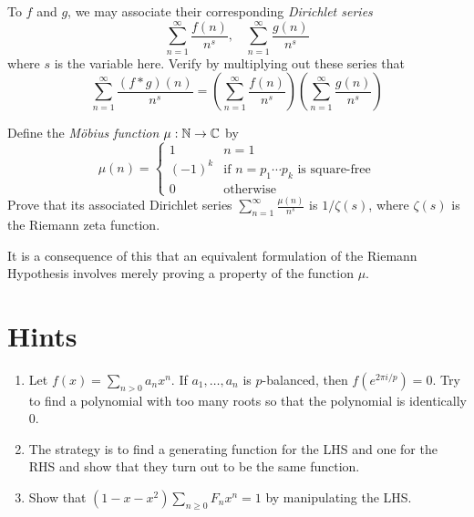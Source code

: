\documentclass{article}
\begin{document}
To $f$ and $g$, we may associate their corresponding \emph{Dirichlet series} 
\[\sum_{n=1}^\infty \frac{f(n)}{n^s},\ \ \ \ \sum_{n=1}^\infty \frac{g(n)}{n^s}\] where $s$ is the variable here. Verify by multiplying out these series that 
\[\sum_{n=1}^\infty \frac{(f*g)(n)}{n^s} = \left(\sum_{n=1}^\infty \frac{f(n)}{n^s}\right)\left(\sum_{n=1}^\infty \frac{g(n)}{n^s}\right)\]
\begin{exercise}
Define the \emph{Möbius function} $\mu:\mathbb{N}\to \mathbb{C}$ by 
\[\mu(n)=\begin{cases} 1 & n=1 \\ (-1)^k & \text{if $n=p_1\cdots p_k$ is square-free} \\ 0 & \text{otherwise}\end{cases}\]
Prove that its associated Dirichlet series $\sum_{n=1}^\infty \frac{\mu(n)}{n^s}$ is $1/\zeta(s)$, where $\zeta(s)$ is the Riemann zeta function. 
\end{exercise}
It is a consequence of this that an equivalent formulation of the Riemann Hypothesis involves merely proving a property of the function $\mu$.


\newpage

\section{Hints}

\begin{enumerate}
    \item Let \(f(x)=\sum_{n>0}a_nx^n\). If \(a_1,\ldots,a_n\) is \(p\)-balanced, then \(f(e^{2\pi i/p})=0\).
    Try to find a polynomial with too many roots so that the polynomial is identically 0.
    \item The strategy is to find a generating function for the LHS and one for the RHS and show that they turn out to be the same function.
    \item Show that \((1-x-x^2)\sum_{n\geq 0}F_nx^n=1\) by manipulating the LHS.
\end{enumerate}
\end{document}
